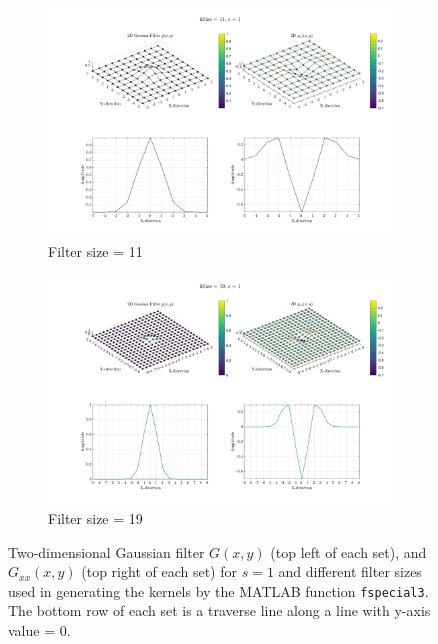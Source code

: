 \documentclass[usletter, 11pt, titlepage]{article}
\begin{document}
\begin{figure}[!h]
    \begin{subfigure}[b]{0.5\textwidth}            
            \includegraphics[width=\textwidth]{"s = 1, hSize = 11_normalized"}
            \caption{Filter size = 11}
            \label{fig:Filter size 11}
    \end{subfigure}%
    \begin{subfigure}[b]{0.5\textwidth}
            \centering
            \includegraphics[width=\textwidth]{"s = 1, hSize = 19_normalized"}
            \caption{Filter size = 19}
            \label{fig:Filter size 19}
    \end{subfigure}
    
    \caption{Two-dimensional Gaussian filter $G(x,y)$ (top left of each set), and $G_{xx}(x,y)$ (top right of each set) for $s = 1$ and different filter sizes used in generating the kernels by the MATLAB function \texttt{fspecial3}. The bottom row of each set is a traverse line along a line with y-axis value = 0.}
    \label{fig:Filters}
\end{figure}
\end{document}
